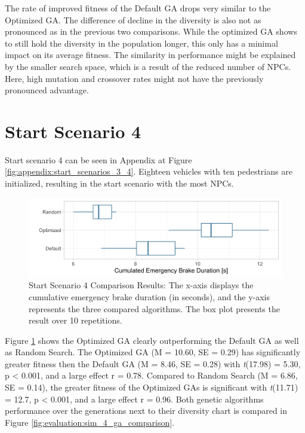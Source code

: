 The rate of improved fitness of the Default GA drops very similar to the Optimized GA. The difference of decline in the diversity is also not as pronounced as in the previous two comparisons. While the optimized GA shows to still hold the diversity in the population longer, this only has a minimal impact on its average fitness. The similarity in performance might be explained by the smaller search space, which is a result of the reduced number of NPCs. Here, high mutation and crossover rates might not have the previously pronounced advantage.

\section{Start Scenario 4}
Start scenario 4 can be seen in Appendix at Figure \ref{fig:appendix:start_scenarios_3_4}. Eighteen vehicles with ten pedestrians are initialized, resulting in the start scenario with the most NPCs.

\begin{figure}[ht] 
	\includegraphics[width=1\linewidth]{simulations/evaluation/plots/sim_4_comparison}
	\caption{Start Scenario 4 Comparison Results: The x-axis displays the cumulative emergency brake duration (in seconds), and the y-axis represents the three compared algorithms. The box plot presents the result over 10 repetitions.}
	\label{fig:evaluation:sim_4_comparison}
\end{figure}

Figure \ref{fig:evaluation:sim_4_comparison} shows the Optimized GA clearly outperforming the Default GA as well as Random Search.
The Optimized GA (M = 10.60, SE = 0.29) has significantly greater fitness then the Default GA (M = 8.46, SE = 0.28) with \textit{t}(17.98) = 5.30, p < 0.001, and a large effect r = 0.78.
Compared to Random Search (M = 6.86, SE = 0.14), the greater fitness of the Optimized GAs is significant with \textit{t}(11.71) = 12.7, p < 0.001, and a large effect r = 0.96. Both genetic algorithms performance over the generations next to their diversity chart is compared in Figure \ref{fig:evaluation:sim_4_ga_comparison}.

